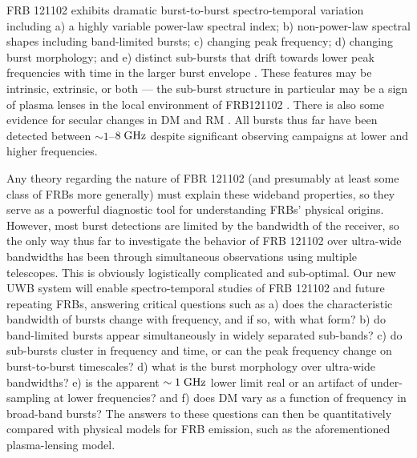 \documentclass[10pt]{myNSF}
\begin{document}
FRB 121102 exhibits dramatic burst-to-burst spectro-temporal variation
including a) a highly variable power-law spectral index; b)
non-power-law spectral shapes including band-limited bursts; c)
changing peak frequency; d) changing burst morphology; and e) distinct
sub-bursts that drift towards lower peak frequencies with time in the
larger burst envelope \citep{ssh+16b}.  These features may be
intrinsic, extrinsic, or both --- the sub-burst structure in
particular may be a sign of plasma lenses in the local environment of
FRB121102 \citep{cwh+17,myc+18}.  There is also some evidence for
secular changes in DM and RM \citep{msh+18,gsp+18}.  All bursts thus
far have been detected between $\sim 1$--$8\; \textrm{GHz}$ despite
significant observing campaigns at lower and higher frequencies.

Any theory regarding the nature of FBR 121102 (and presumably at least
some class of FRBs more generally) must explain these wideband
properties, so they serve as a powerful diagnostic tool for
understanding FRBs' physical origins.  However, most burst detections
are limited by the bandwidth of the receiver, so the only way thus far
to investigate the behavior of FRB 121102 over ultra-wide bandwidths
has been through simultaneous observations using multiple telescopes.
This is obviously logistically complicated and sub-optimal.  Our new
UWB system will enable spectro-temporal studies of FRB 121102 and
future repeating FRBs, answering critical questions such as a) does
the characteristic bandwidth of bursts change with frequency, and if
so, with what form? b) do band-limited bursts appear simultaneously in
widely separated sub-bands? c) do sub-bursts cluster in frequency and
time, or can the peak frequency change on burst-to-burst timescales?
d) what is the burst morphology over ultra-wide bandwidths? e) is the
apparent $\sim 1\; \textrm{GHz}$ lower limit real or an artifact of
under-sampling at lower frequencies? and f) does DM vary as a function
of frequency in broad-band bursts?  The answers to these questions can
then be quantitatively compared with physical models for FRB emission,
such as the aforementioned plasma-lensing model.
\end{document}
